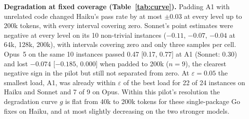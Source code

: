 \documentclass[10pt]{article}
\newcommand{\eps}{\varepsilon}
\begin{document}
\begin{table}[t]
\centering\small
{}
\caption{Base arms, Claude Haiku 5.5, 24 instances, 10 samples per cell. Counts are over 240 samples per arm.}
\label{tab:base}
\end{table}

\textbf{Degradation at fixed coverage (Table~\ref{tab:curve}).} Padding A1 with unrelated code changed Haiku's pass rate by at most $\pm 0.03$ at every level up to 200k tokens, with every interval covering zero. Sonnet's point estimates were negative at every level on its 10 non-trivial instances ($-0.11$, $-0.07$, $-0.04$ at 64k, 128k, 200k), with intervals covering zero and only three samples per cell. Opus~5 on the same 10 instances passed 0.47 [0.17, 0.77] at A1 (Sonnet: 0.30) and lost $-0.074$ [$-0.185$, $0.000$] when padded to 200k ($n=9$), the clearest negative sign in the pilot but still not separated from zero. At $\eps = 0.05$ the smallest load, A1, was already within $\eps$ of the best load for 22 of 24 instances on Haiku and Sonnet and 7 of 9 on Opus. Within this pilot's resolution the degradation curve $g$ is flat from 40k to 200k tokens for these single-package Go fixes on Haiku, and at most slightly decreasing on the two stronger models.
\end{document}
